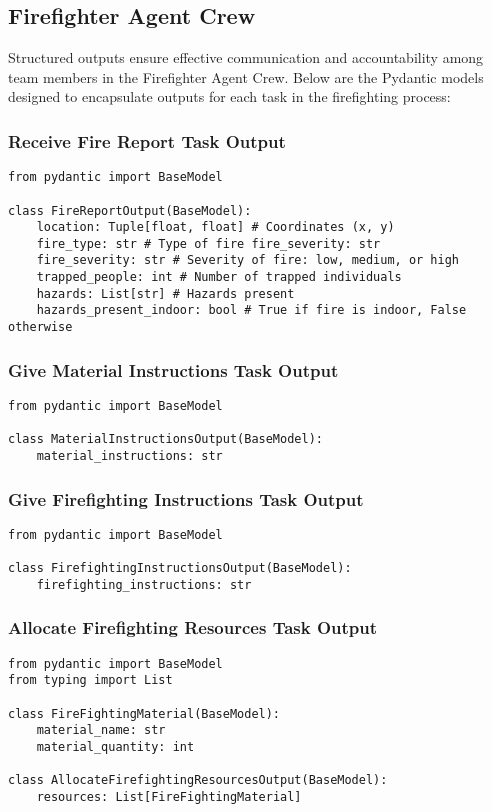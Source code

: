 \subsection{Firefighter Agent Crew}

Structured outputs ensure effective communication and accountability among team members in the Firefighter Agent Crew. Below are the Pydantic models designed to encapsulate outputs for each task in the firefighting process:

\subsubsection{Receive Fire Report Task Output}
\begin{lstlisting}[caption={Pydantic model for Receive Fire Report Task Output}]
from pydantic import BaseModel

class FireReportOutput(BaseModel):
    location: Tuple[float, float] # Coordinates (x, y)
    fire_type: str # Type of fire fire_severity: str
    fire_severity: str # Severity of fire: low, medium, or high
    trapped_people: int # Number of trapped individuals
    hazards: List[str] # Hazards present
    hazards_present_indoor: bool # True if fire is indoor, False otherwise
\end{lstlisting}

\subsubsection{Give Material Instructions Task Output}
\begin{lstlisting}[caption={Pydantic model for Material Instructions Task Output}]
from pydantic import BaseModel

class MaterialInstructionsOutput(BaseModel):
    material_instructions: str
\end{lstlisting}


\subsubsection{Give Firefighting Instructions Task Output}
\begin{lstlisting}[caption={Pydantic model for Firefighting Instructions Task Output}]
from pydantic import BaseModel

class FirefightingInstructionsOutput(BaseModel):
    firefighting_instructions: str
\end{lstlisting}


\subsubsection{Allocate Firefighting Resources Task Output}
\begin{lstlisting}[caption={Pydantic model for Allocate Firefighting Resources Task Output}]
from pydantic import BaseModel
from typing import List

class FireFightingMaterial(BaseModel):
    material_name: str
    material_quantity: int

class AllocateFirefightingResourcesOutput(BaseModel):
    resources: List[FireFightingMaterial]
\end{lstlisting}


